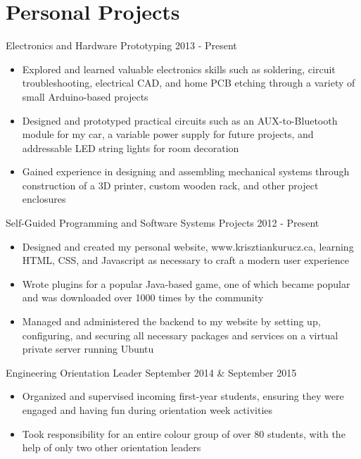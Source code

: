 \documentclass[hidelinks]{kkurucz-cv}
\begin{document}

\section{Personal Projects}

\begin{entrylist}
\entry
{\vspace{-9mm}\null}
{Electronics and Hardware Prototyping}
{2013 - Present}
{
\vspace{-3mm}
\begin{itemize}
	\item Explored and learned valuable electronics skills such as soldering, circuit troubleshooting, electrical CAD, and home PCB etching through a variety of small Arduino-based projects
	\item Designed and prototyped practical circuits such as an AUX-to-Bluetooth module for my car, a variable power supply for future projects, and addressable LED string lights for room decoration
	\item Gained experience in designing and assembling mechanical systems through construction of a 3D printer, custom wooden rack, and other project enclosures
\end{itemize}
}
{\null}
\entry
{\vspace{-9mm}\null}
{Self-Guided Programming and Software Systems Projects}
{2012 - Present}
{
\vspace{-3mm}
\begin{itemize}
	\item Designed and created my personal website, www.krisztiankurucz.ca, learning HTML, CSS, and Javascript as necessary to craft a modern user experience
	\item Wrote plugins for a popular Java-based game, one of which became popular and was downloaded over 1000 times by the community
	\item Managed and administered the backend to my website by setting up, configuring, and securing all necessary packages and services on a virtual private server running Ubuntu
\end{itemize}
}
{\null}
\entry
{\vspace{-9mm}\null}
{Engineering Orientation Leader}
{September 2014 \& September 2015}
{
\vspace{-3mm}
\begin{itemize}
	\item Organized and supervised incoming first-year students, ensuring they were engaged and having fun during orientation week activities
	\item Took responsibility for an entire colour group of over 80 students, with the help of only two other orientation leaders
	\end{itemize}
}
{\null}
\end{entrylist}
\end{document}
